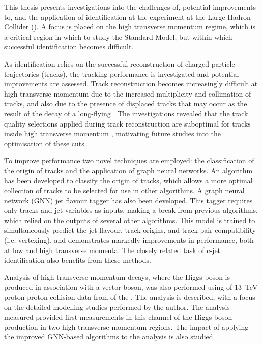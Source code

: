 
This thesis presents investigations into the challenges of, potential improvements to, and the application of \bjet identification at the \ATLAS experiment at the Large Hadron Collider (\LHC).
A focus is placed on the high transverse momentum regime, which is a critical region in which to study the Standard Model, but within which successful \bjet identification becomes difficult.

As \bjet identification relies on the successful reconstruction of charged particle trajectories (tracks), the tracking performance is investigated and potential improvements are assessed.
Track reconstruction becomes increasingly difficult at high transverse momentum due to the increased multiplicity and collimation of tracks, and also due to the presence of displaced tracks that may occur as the result of the decay of a long-flying \bhadron.
The investigations revealed that the track quality selections applied during track reconstruction are suboptimal for tracks inside high transverse momentum \bjets, motivating future studies into the optimisation of these cuts.

To improve \btagging performance two novel techniques are employed: the classification of the origin of tracks and the application of graph neural networks.
An algorithm has been developed to classify the origin of tracks, which allows a more optimal collection of tracks to be selected for use in other algorithms. A graph neural network (GNN) jet flavour tagger has also been developed.
This tagger requires only tracks and jet variables as inputs, making a break from previous algorithms, which relied on the outputs of several other algorithms.
This model is trained to simultaneously predict the jet flavour, track origins, and track-pair compatibility (i.e. vertexing), and demonstrates markedly improvements in \btagging performance, both at low and high transverse momenta.
The closely related task of c-jet identification also benefits from these methods.

Analysis of high transverse momentum \Hbb decays, where the Higgs boson is produced in association with a vector boson, was also performed using \intlumi of \SI{13}{\TeV} proton-proton collision data from \runtwo of the \LHC.
The analysis is described, with a focus on the detailed modelling studies performed by the author.
The analysis measured provided first measurements in this channel of the Higgs boson production in two high transverse momentum regions. 
The impact of applying the improved GNN-based \btagging algorithms to the analysis is also studied.